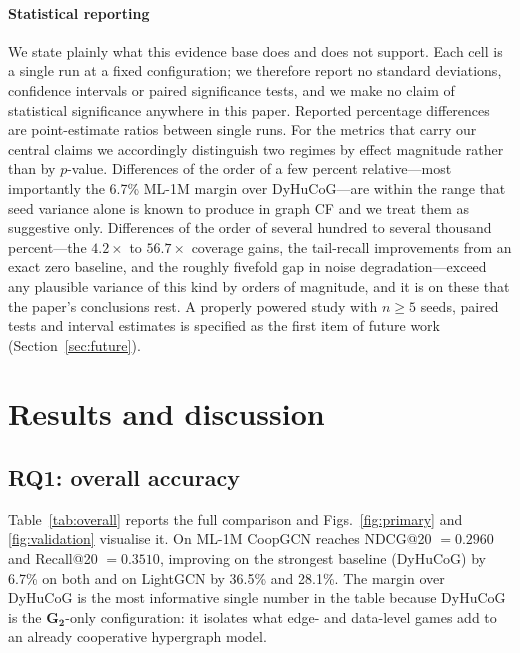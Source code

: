 \documentclass[final,5p,times,twocolumn]{elsarticle}
\begin{document}
\paragraph{Statistical reporting}
We state plainly what this evidence base does and does not support. Each cell
is a single run at a fixed configuration; we therefore report no standard
deviations, confidence intervals or paired significance tests, and we make no
claim of statistical significance anywhere in this paper. Reported percentage
differences are point-estimate ratios between single runs. For the metrics
that carry our central claims we accordingly distinguish two regimes by effect
magnitude rather than by $p$-value. Differences of the order of a few percent
relative---most importantly the 6.7\% ML-1M margin over DyHuCoG---are within
the range that seed variance alone is known to produce in graph CF
\citep{dacrema2019worrying} and we treat them as suggestive only. Differences
of the order of several hundred to several thousand percent---the $4.2\times$
to $56.7\times$ coverage gains, the tail-recall improvements from an exact
zero baseline, and the roughly fivefold gap in noise degradation---exceed any
plausible variance of this kind by orders of magnitude, and it is on these
that the paper's conclusions rest. A properly powered study with $n \ge 5$
seeds, paired tests and interval estimates is specified as the first item of
future work (Section~\ref{sec:future}).

\section{Results and discussion}
\label{sec:results}

\subsection{RQ1: overall accuracy}
\label{sec:rq1}

Table~\ref{tab:overall} reports the full comparison and
Figs.~\ref{fig:primary} and \ref{fig:validation} visualise it. On ML-1M
CoopGCN reaches NDCG@20 $=0.2960$ and Recall@20 $=0.3510$, improving on the
strongest baseline (DyHuCoG) by 6.7\% on both and on LightGCN by 36.5\% and
28.1\%. The margin over DyHuCoG is the most informative single number in the
table because DyHuCoG is the $\mathbf{G_2}$-only configuration: it isolates
what edge- and data-level games add to an already cooperative hypergraph
model.
\end{document}

